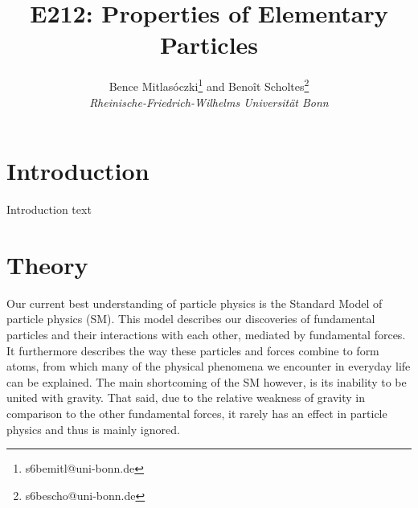 \documentclass[twocolumn]{article}
\title{\textbf{E212: Properties of Elementary Particles}}
\author{Bence Mitlasóczki\thanks{s6bemitl@uni-bonn.de} and Beno\^it Scholtes\thanks{s6bescho@uni-bonn.de} \\ \textit{Rheinische-Friedrich-Wilhelms Universit\"at Bonn}}
\begin{document}
\renewcommand{\abstractname}{\vspace{-\baselineskip}} %
\maketitle
\saythanks %
\section{Introduction}
Introduction text

\section{Theory}
Our current best understanding of particle physics is the Standard Model of particle physics (SM). This model describes our discoveries of fundamental particles and their interactions with each other, mediated by fundamental forces. It furthermore describes the way these particles and forces combine to form atoms, from which many of the physical phenomena we encounter in everyday life can be explained. The main shortcoming of the SM however, is its inability to be united with gravity. That said, due to the relative weakness of gravity in comparison to the other fundamental forces, it rarely has an effect in particle physics and thus is mainly ignored.
\end{document}
